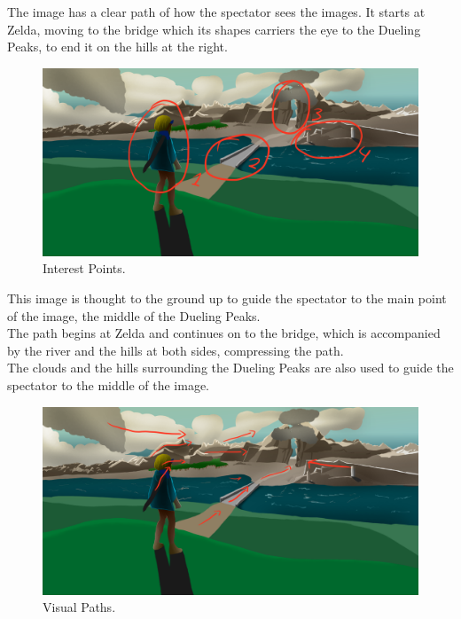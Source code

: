 \documentclass{cup-pan}
\begin{document}
            The image has a clear path of how the spectator sees the images. It starts at Zelda, moving to the bridge which its shapes carriers the eye to the Dueling Peaks, to end it on the hills at the right.\\
            \begin{figure}[H]
                \includegraphics[width=\textwidth]{Imagenes/Fanart1/Analysis/puntosinteres.png}
                \caption{Interest Points.}
            \end{figure}

            This image is thought to the ground up to guide the spectator to the main point of the image, the middle of the Dueling Peaks.\\
            The path begins at Zelda and continues on to the bridge, which is accompanied by the river and the hills at both sides, compressing the path.\\
            The clouds and the hills surrounding the Dueling Peaks are also used to guide the spectator to the middle of the image.\\
            \begin{figure}[H]
                \includegraphics[width=\textwidth]{Imagenes/Fanart1/Analysis/recorridovisual.png}
                \caption{Visual Paths.}
            \end{figure}
\end{document}
